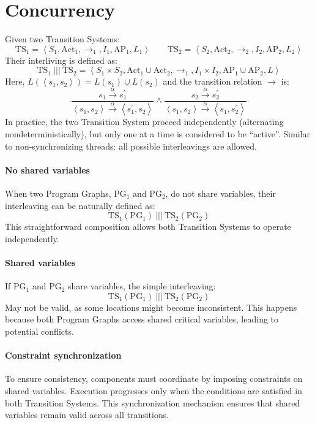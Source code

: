 \section{Concurrency}

Given two Transition Systems: 
\[\text{TS}_1=\left\langle S_1, \text{Act}_1, \rightarrow_1, I_1,\text{AP}_1, L_1\right\rangle \qquad \text{TS}_2=\left\langle S_2, \text{Act}_2, \rightarrow_2, I_2,\text{AP}_2, L_2\right\rangle\]    
Their interliving is defined as: 
\[\text{TS}_1\:|||\:\text{TS}_2=\left\langle S_1\times S_2, \text{Act}_1 \cup \text{Act}_2, \rightarrow_1, I_1\times I_2,\text{AP}_1\cup \text{AP}_2, L\right\rangle\]
Here,  $L(\left\langle s_1,s_2\right\rangle )= L(s_1) \cup L(s_2)$ and the transition relation $\rightarrow$ is:
\[\dfrac{s_1\xrightarrow{\alpha}s_1^\prime}{\left\langle s_1,s_2\right\rangle \xrightarrow{\alpha}\left\langle s_1^\prime,s_2\right\rangle} \land \dfrac{s_2\xrightarrow{\alpha}s_2^\prime}{\left\langle s_1,s_2\right\rangle \xrightarrow{\alpha}\left\langle s_1,s_2^\prime\right\rangle}\]
In practice, the two Transition System proceed independently (alternating nondeterministically), but only one at a time is considered to be “active”. 
Similar to non-synchronizing threads: all possible interleavings are allowed.

\paragraph*{No shared variables}
When two Program Graphs, $\text{PG}_1$ and $\text{PG}_2$, do not share variables, their interleaving can be naturally defined as:
\[\text{TS}_1(\text{PG}_1)\:|||\: \text{TS}_2(\text{PG}_2)\] 
This straightforward composition allows both Transition Systems to operate independently.

\paragraph*{Shared variables} 
If $\text{PG}_1$ and $\text{PG}_2$ share variables, the simple interleaving:
\[\text{TS}_1(\text{PG}_1)\:|||\:\text{TS}_2(\text{PG}_2)\] 
May not be valid, as some locations might become inconsistent. 
This happens because both Program Graphs access shared critical variables, leading to potential conflicts.

\paragraph*{Constraint synchronization}
To ensure consistency, components must coordinate by imposing constraints on shared variables.
Execution progresses only when the conditions are satisfied in both Transition Systems. 
This synchronization mechanism ensures that shared variables remain valid across all transitions.

